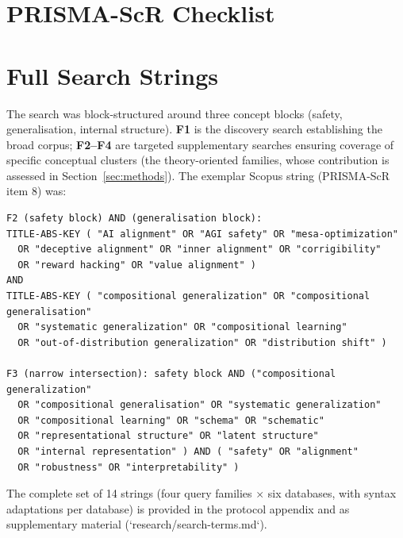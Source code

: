 


\appendix

\section{PRISMA-ScR Checklist}\label{app:prisma-scr}



\section{Full Search Strings}\label{app:search-strings}

The search was block-structured around three concept blocks (safety, generalisation, internal structure). \textbf{F1} is the discovery search establishing the broad corpus; \textbf{F2--F4} are targeted supplementary searches ensuring coverage of specific conceptual clusters (the theory-oriented families, whose contribution is assessed in Section~\ref{sec:methods}). The exemplar Scopus string (PRISMA-ScR item 8) was:

\begin{verbatim}
F2 (safety block) AND (generalisation block):
TITLE-ABS-KEY ( "AI alignment" OR "AGI safety" OR "mesa-optimization"
  OR "deceptive alignment" OR "inner alignment" OR "corrigibility"
  OR "reward hacking" OR "value alignment" )
AND
TITLE-ABS-KEY ( "compositional generalization" OR "compositional generalisation"
  OR "systematic generalization" OR "compositional learning"
  OR "out-of-distribution generalization" OR "distribution shift" )

F3 (narrow intersection): safety block AND ("compositional generalization"
  OR "compositional generalisation" OR "systematic generalization"
  OR "compositional learning" OR "schema" OR "schematic"
  OR "representational structure" OR "latent structure"
  OR "internal representation" ) AND ( "safety" OR "alignment"
  OR "robustness" OR "interpretability" )
\end{verbatim}

The complete set of 14 strings (four query families $\times$ six databases, with syntax adaptations per database) is provided in the protocol appendix and as supplementary material (`research/search-terms.md`).

